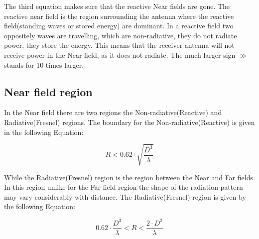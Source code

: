 The third equation makes sure that the reactive Near fields are gone. The reactive near field is the region surrounding the antenna where the reactive field(standing waves or stored energy) are dominant. In a reactive field two oppositely waves are travelling, which are non-radiative, they do not radiate power, they store the energy. This means that the receiver antenna will not receive power in the Near field, as it does not radiate. %
The much larger sign $\gg$ stands for 10 times larger. 













\subsection{Near field region}

In the Near field there are two regions the Non-radiative(Reactive) and Radiative(Fresnel) regions. The boundary for the Non-radiative(Reactive) is given in the following Equation:

\begin{equation}
R < 0.62 \cdot \sqrt{\frac{D^{3}}{\lambda}}
\label{far_field_eq1}
\end{equation}


While the Radiative(Fresnel) region is the region between the Near and Far fields. In this region unlike for the Far field region the shape of the radiation pattern may vary considerably with distance. The Radiative(Fresnel) region is given by the following Equation:


\begin{equation}
0.62 \cdot \frac{D^{3}}{\lambda} < R < \frac{2 \cdot D^{2}}{\lambda}
\label{far_field_eq1}
\end{equation}


